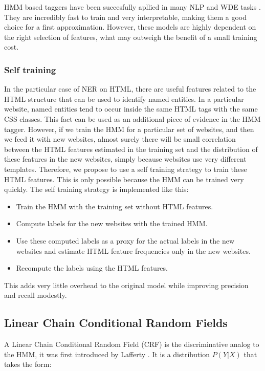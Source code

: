\documentclass[sigconf]{acmart}
\begin{document}
HMM based taggers have been succesfully apllied in many NLP and WDE tasks 
\cite{Rabiner1990, Leek1997, Freitag2000}. They are incredibly fast to train and very 
interpretable, making them a good choice for a first approximation. However, these models 
are highly dependent on the right selection of features, what may outweigh the benefit of a 
small training cost.

\subsubsection{Self training} \label{sssec:self_training}

In the particular case of NER on HTML, there are useful features related to the HTML
structure that can be used to identify named entities. In a particular website, named
entities tend to occur inside the same HTML tags with the same CSS classes. This fact
can be used as an additional piece of evidence in the HMM tagger. However, if we train 
the HMM for a particular set of websites, and then we feed it with new websites, almost 
surely there will be small correlation between the HTML features estimated in the training 
set and the distribution of these features in the new websites, simply because websites 
use very different templates. Therefore, we propose to use a self training strategy to train 
these HTML features. This is only possible because the HMM can be trained very quickly. The 
self training strategy is implemented like this:

\begin{itemize}
\item Train the HMM with the training set without HTML features.
\item Compute labels for the new websites with the trained HMM.
\item Use these computed labels as a proxy for the actual labels in the 
new websites and estimate HTML feature frequencies only in the new websites.
\item Recompute the labels using the HTML features.
\end{itemize}

This adds very little overhead to the original model while improving precision and recall
modestly.

\subsection{Linear Chain Conditional Random Fields}

A Linear Chain Conditional Random Field (CRF) is the discriminative analog to the HMM,
it was first introduced by Lafferty \cite{Lafferty2001}. It is a distribution $ P(Y|X) $ that takes the form:
\end{document}
